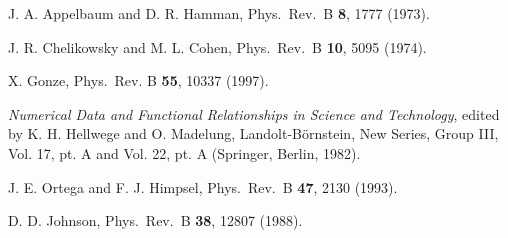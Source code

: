 \documentclass[twocolumn,prb,showpacs,superscriptaddress]{revtex4}
\begin{document}
\begin{thebibliography}{99}
J. A. Appelbaum and D. R. Hamman, 
Phys.\ Rev.\ B {\bf 8}, 1777 (1973).

J. R. Chelikowsky and M. L. Cohen,
Phys.\ Rev.\ B {\bf 10}, 5095 (1974).

X. Gonze,
Phys.\ Rev. B {\bf 55}, 10337 (1997).

{\it Numerical Data and Functional Relationships in Science and Technology}, 
edited by K. H. Hellwege and O. Madelung, Landolt-B\"ornstein, 
New Series, Group III, Vol. 17, pt. A and Vol. 22, pt. A (Springer, Berlin, 1982).

J. E. Ortega and F. J. Himpsel, 
Phys.\ Rev.\ B {\bf 47}, 2130 (1993).

D. D. Johnson, 
Phys.\ Rev.\ B {\bf 38}, 12807 (1988).

\end{thebibliography}
\end{document}
